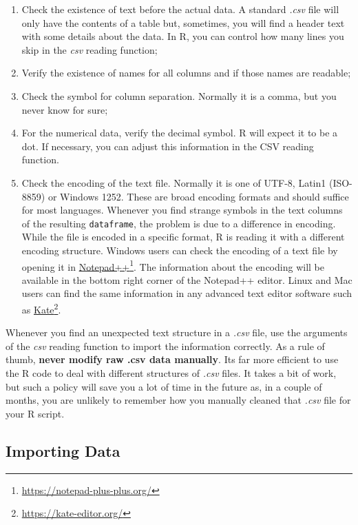 \documentclass[
  12pt,
]{book}
\newenvironment{rmdimportant}
{\begin{importantblock}
		
	} {\end{importantblock}}
\begin{document}
\begin{enumerate}
\def\labelenumi{\arabic{enumi})}
\item
  Check the existence of text before the actual data. A standard \emph{.csv} file will only have the contents of a table but, sometimes, you will find a header text with some details about the data. In R, you can control how many lines you skip in the \emph{csv} reading function;
\item
  Verify the existence of names for all columns and if those names are readable;
\item
  Check the symbol for column separation. Normally it is a comma, but you never know for sure;
\item
  For the numerical data, verify the decimal symbol. R will expect it to be a dot. If necessary, you can adjust this information in the CSV reading function.
\item
  Check the encoding of the text file. Normally it is one of UTF-8, Latin1 (ISO-8859) or Windows 1252. These are broad encoding formats and should suffice for most languages. Whenever you find strange symbols in the text columns of the resulting \texttt{dataframe}, the problem is due to a difference in encoding. While the file is encoded in a specific format, R is reading it with a different encoding structure. Windows users can check the encoding of a text file by opening it in \href{https://notepad-plus-plus.org/}{Notepad++}\footnote{\url{https://notepad-plus-plus.org/}}. The information about the encoding will be available in the bottom right corner of the Notepad++ editor. Linux and Mac users can find the same information in any advanced text editor software such as \href{https://kate-editor.org/}{Kate}\footnote{\url{https://kate-editor.org/}}.
\end{enumerate}

\begin{rmdimportant}
Whenever you find an unexpected text structure in a \emph{.csv} file,
use the arguments of the \emph{csv} reading function to import the
information correctly. As a rule of thumb, \textbf{never modify raw .csv
data manually}. Its far more efficient to use the R code to deal with
different structures of \emph{.csv} files. It takes a bit of work, but
such a policy will save you a lot of time in the future as, in a couple
of months, you are unlikely to remember how you manually cleaned that
\emph{.csv} file for your R script.
\end{rmdimportant}

\hypertarget{importing-data}{%
\subsection{Importing Data}\label{importing-data}}
\end{document}
